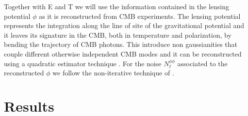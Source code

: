 \documentclass[aps,prd,reprint,superscriptaddress]{revtex4-1}
\begin{document}
Together with E and T we will use the information contained in the lensing potential $\phi$ as it is reconstructed from CMB experiments. The lensing potential represents the integration along the line of site of the gravitational potential and it leaves its signature in the CMB, both in temperature and polarization, by bending the trajectory of CMB photons. This introduce non gaussianities that couple different otherwise independent CMB modes and it can be reconstructed using a quadratic estimator technique \cite{okamoto:2003,hu:2002}.
For the noise $N_\ell^{\phi\phi}$ associated to the reconstructed $\phi$ we follow the non-iterative technique of \cite{okamoto:2003,hu:2002}.




%




\section{Results \label{sec:results}}

%
%
%
\end{document}
